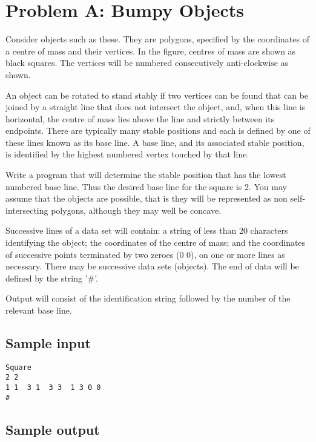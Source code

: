 
\section*{Problem A: Bumpy Objects}

Consider objects such as these.  They are polygons, specified by the
coordinates of a centre of mass and their vertices.  In the figure,
centres of mass are shown as black squares.  The vertices will be
numbered consecutively anti-clockwise as shown.

An object can be rotated to stand stably if two vertices can be found
that can be joined by a straight line that does not intersect the
object, and, when this line is horizontal, the centre of mass lies
above the line and strictly between its endpoints.  There are
typically many stable positions and each is defined by one of these
lines known as its base line.  A base line, and its associated stable
position, is identified by the highest numbered vertex touched by that
line.

Write a program that will determine the stable position that has the
lowest numbered base line.  Thus the desired
base line for the
square is 2.  You may assume that the objects are possible, that is they
will be represented as non self-intersecting polygons, although they
may well be concave.

Successive lines of a data set will contain: a string of less than 20
characters identifying the object; the coordinates of the centre of
mass; and the coordinates of successive points terminated by two
zeroes (0 0), on one or more lines as necessary.  There may be
successive data sets (objects).  The end of data will be defined by
the string '\#'.

Output will consist of the identification string followed by the
number of the relevant base line. 

\subsection*{Sample input}

\begin{verbatim}
Square
2 2
1 1  3 1  3 3  1 3 0 0
#
\end{verbatim}

\subsection*{Sample output}

